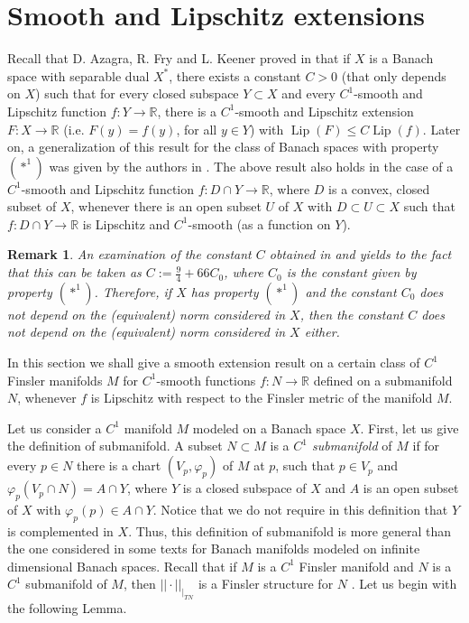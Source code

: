 \documentclass[11pt]{amsart}
\newtheorem{rem}[thm]{Remark}
\numberwithin{equation}{section}
\begin{document}
\section{Smooth and Lipschitz extensions}

Recall that D. Azagra, R. Fry and L. Keener proved in  \cite{Azafrykeener} that if  $X$ is a Banach space with separable dual $X^*$, there exists a constant $C>0$ (that  only depends  on $X$) such that for every closed subspace $Y\subset X$ and every $C^1$-smooth and Lipschitz function $f:Y\rightarrow \mathbb R$, there is a $C^1$-smooth and Lipschitz extension $F:X\rightarrow \mathbb R$ (i.e. $F(y)=f(y)$, for all $y\in Y$) with  ${\operatorname{Lip}}(F)\le C {\operatorname{Lip}}(f)$. Later on, a generalization of this result for  the class of Banach spaces with property $(*^1)$ was given by the authors in \cite{MarLuis}.
The above result  also holds in the case of a  $C^1$-smooth and Lipschitz function  $f:D\cap Y
\rightarrow \mathbb R$, where $D$ is a convex, closed subset of $X$, whenever there is an open  subset $U$ of $X$ with $D\subset U\subset X$ such that  $f:D\cap Y\rightarrow \mathbb R$ is Lipschitz and $C^1$-smooth (as a function on $Y$).
\begin{rem}
An examination of the constant $C$ obtained in  \cite{Azafrykeener} and \cite{MarLuis} yields to the fact that this
 can be taken as $C:= \frac{9}{4}+66C_0$, where $C_0$ is the constant given by property $(*^1)$.
 Therefore, if $X$ has property $(*^1)$ and the constant $C_0$ does not depend on the (equivalent) norm considered in $X$,
 then the constant $C$  does not depend on the (equivalent) norm considered in $X$ either.
\end{rem}
In this section we shall give a smooth extension result  on a certain class of  $C^1$ Finsler manifolds $M$ for $C^1$-smooth
functions $f:N\rightarrow \mathbb R$ defined on a submanifold $N$,
whenever $f$ is Lipschitz  with respect to the Finsler metric of the manifold $M$.

Let us consider a $C^1$ manifold $M$ modeled on a Banach space $X$.
First, let us give the definition of submanifold. A subset  $N\subset M$ is a {\em $C^1$ submanifold } of $M$ if for every $p\in N$ there is a chart
$(V_p,\varphi_p)$ of $M$ at $p$, such that $p\in V_p$  and $\varphi_p(V_p\cap N)=A\cap Y$, where $Y$ is a closed subspace of $X$ and $A$ is an open subset of $X$ with $\varphi_p(p)\in A\cap Y$.
Notice that we do not require in this definition that $Y$  is complemented in $X$. Thus, this definition of submanifold
is more general than the one considered in some texts for Banach manifolds modeled on infinite dimensional Banach spaces.
Recall that if $M$ is a $C^1$ Finsler manifold and $N$ is a $C^1$ submanifold of $M$, then $||\cdot||_{\mid_{TN}}$ is a Finsler structure for $N$ \cite[Theorem 3.6]{Palais}.
Let us begin with the following Lemma.
\end{document}

